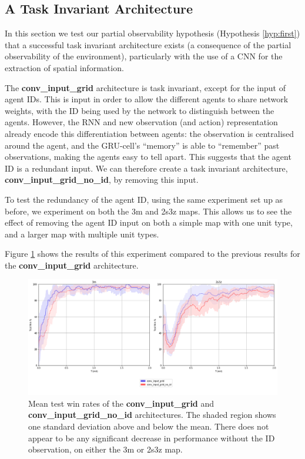 \subsection{A Task Invariant Architecture}
In this section we test our partial observability hypothesis (Hypothesis \ref{hyp:first}) that a successful task invariant architecture exists (a consequence of the partial observability of the environment), particularly with the use of a CNN for the extraction of spatial information.

The \textbf{conv\_input\_grid} architecture is task invariant, except for the input of agent IDs. This is input in order to allow the different agents to share network weights, with the ID being used by the network to distinguish between the agents. However, the RNN and new observation (and action) representation already encode this differentiation between agents: the observation is centralised around the agent, and the GRU-cell's ``memory'' is able to ``remember'' past observations, making the agents easy to tell apart. This suggests that the agent ID is a redundant input. We can therefore create a task invariant architecture, \textbf{conv\_input\_grid\_no\_id}, by removing this input.


To test the redundancy of the agent ID, using the same experiment set up as before, we experiment on both the 3m and 2s3z maps. This allows us to see the effect of removing the agent ID input on both a simple map with one unit type, and a larger map with multiple unit types.

Figure \ref{fig:noid} shows the results of this experiment compared to the previous results for the \textbf{conv\_input\_grid} architecture.

\begin{figure}
    \centering
    \hbox{\hspace{-6.6em}\includegraphics[scale=0.47]{images/graphs/noid.png}}
    \caption{Mean test win rates of the \textbf{conv\_input\_grid} and \textbf{conv\_input\_grid\_no\_id} architectures. The shaded region shows one standard deviation above and below the mean. There does not appear to be any significant decrease in performance without the ID observation, on either the 3m or 2s3z map.}
    \label{fig:noid}
\end{figure}


